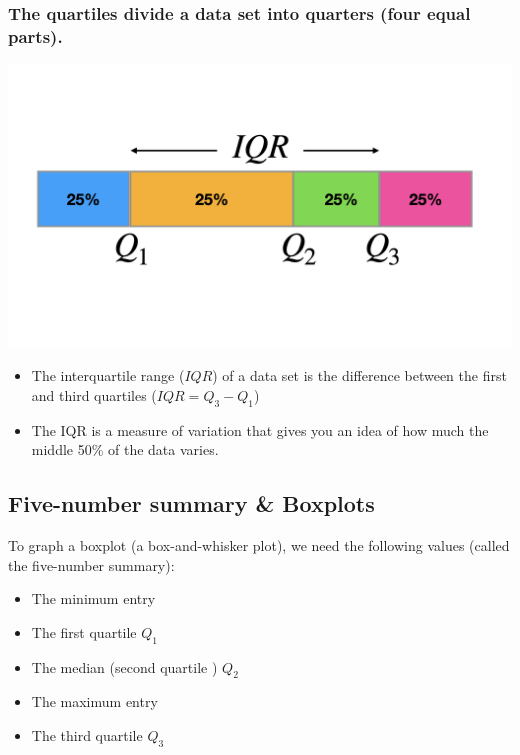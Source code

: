 \documentclass[
]{article}
\providecommand{\tightlist}{%
  \setlength{\itemsep}{0pt}\setlength{\parskip}{0pt}}
\begin{document}
\hypertarget{the-quartiles-divide-a-data-set-into-quarters-four-equal-parts.}{%
\subsubsection{The quartiles divide a data set into quarters (four equal
parts).}\label{the-quartiles-divide-a-data-set-into-quarters-four-equal-parts.}}

\begin{center}\includegraphics[width=0.6\linewidth,height=0.6\textheight]{QQ} \end{center}

\begin{itemize}
\item
  The interquartile range (\(IQR\)) of a data set is the difference
  between the first and third quartiles (\(IQR = Q_3 - Q_1\))
\item
  The IQR is a measure of variation that gives you an idea of how much
  the middle 50\% of the data varies.
\end{itemize}

\hypertarget{five-number-summary-boxplots}{%
\subsection{Five-number summary \&
Boxplots}\label{five-number-summary-boxplots}}

To graph a boxplot (a box-and-whisker plot), we need the following
values (called the five-number summary):

\begin{itemize}
\tightlist
\item
  The minimum entry
\item
  The first quartile \(Q_1\)
\item
  The median (second quartile ) \(Q_2\)
\item
  The maximum entry
\item
  The third quartile \(Q_3\)
\end{itemize}
\end{document}
